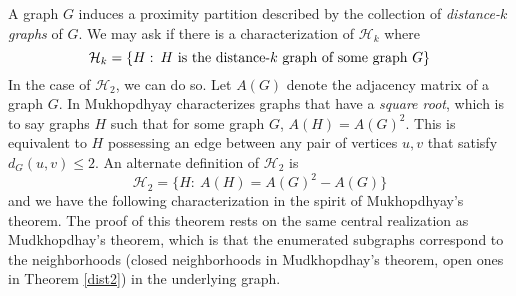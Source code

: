 A graph $G$ induces a proximity partition described by the collection of \textit{distance-$k$ graphs} of $G$.
%
We may ask if there is a characterization of $\mathcal{H}_k$ where
%
\[\mathcal{H}_k = \{H :\: H \makebox{ is the distance-$k$ graph of some graph } G\}\]
%
In the case of $\mathcal{H}_2$, we can do so.
%
Let $A(G)$ denote the adjacency matrix of a graph $G$.  
%
In \cite{sqrtofgraph} Mukhopdhyay characterizes graphs that have a \textit{square root}, which is to say graphs $H$ such that for some graph $G$, $A(H) = A(G)^2$.
%  
This is equivalent to $H$ possessing an edge between any pair of vertices $u,v$ that satisfy $d_G(u,v) \leq 2$.  
%
\noindent An alternate definition of $\mathcal{H}_2$ is 
\[\mathcal{H}_2 = \{H : \: A(H) = A(G)^2-A(G)\}\] and we have the following characterization in the spirit of Mukhopdhyay's theorem.  
The proof of this theorem rests on the same central realization as Mudkhopdhay's theorem, which is that the enumerated subgraphs correspond to the neighborhoods (closed neighborhoods in Mudkhopdhay's theorem, open ones in Theorem \ref{dist2}) in the underlying graph.
